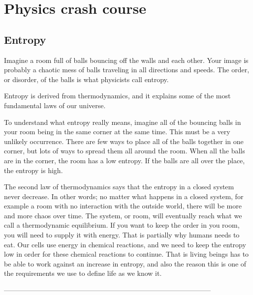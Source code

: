 \section*{Physics crash course}

\subsection*{Entropy}
Imagine a room full of balls bouncing off the walls and each other.
Your image is probably a chaotic mess of balls traveling in all directions and speeds.
The order, or disorder, of the balls is what physicists call entropy.

Entropy is derived from thermodynamics, and it explains some of the most fundamental laws of our universe.

To understand what entropy really means, imagine all of the bouncing balls in your room being in the same corner at the same time.
This must be a very unlikely occurrence.
There are few ways to place all of the balls together in one corner, but lots of ways to spread them all around the room.
When all the balls are in the corner, the room has a low entropy.
If the balls are all over the place, the entropy is high.


The second law of thermodynamics says that the entropy in a closed system never decrease.
In other words; no matter what happens in a closed system, for example a room with no interaction with the outside world, there will be more and more chaos over time.
The system, or room, will eventually reach what we call a thermodynamic equilibrium.
If you want to keep the order in you room, you will need to supply it with energy.
That is partially why humans needs to eat.
Our cells use energy in chemical reactions, and we need to keep the entropy low in order for these chemical reactions to continue.
That is living beings has to be able to work against an increase in entropy, and also the reason this is one of the requirements we use to define life as we know it.


------------------------------------------------------------------------------------------

